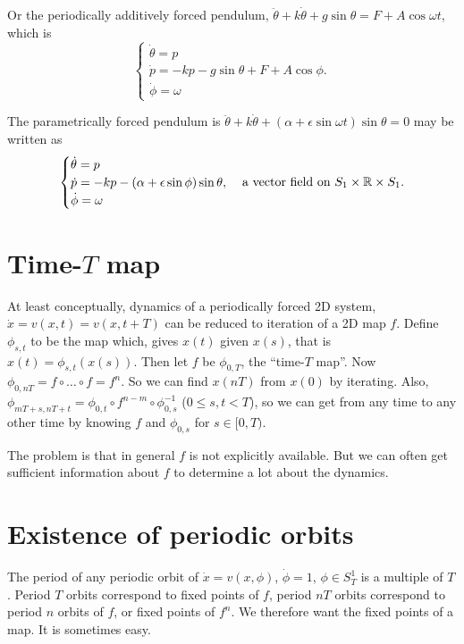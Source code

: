 \documentclass{notes}
\theoremstyle{plain}
\begin{document}
Or the periodically additively forced pendulum, $\ddot{\theta}
+ k \dot{\theta} + g \sin \theta = F + A \cos \omega t$, which is
\[
\begin{cases}
\dot{\theta} = p \\
\dot{p} = -k p - g \sin \theta + F + A \cos \phi. \\
\dot{\phi} = \omega
\end{cases}
\]

The parametrically forced pendulum is $\ddot{\theta} + k \dot{\theta}
+ (\alpha + \epsilon \sin \omega t) \sin \theta = 0$ may be written as
\[
\begin{cases}
\dot{\theta} = p \\
\dot{p} = -k p - (\alpha + \epsilon \sin \phi) \sin \theta, \\
\dot{\phi} = \omega
\end{cases}\text{a vector field on } S_1 \times \mathbb{R} \times S_1.
\]

\section{Time-$T$ map}

At least conceptually, dynamics of a periodically forced 2D system,
$\dot{x} = v(x,t) = v(x,t+T)$ can be reduced to iteration of a 2D map
$f$.  Define $\phi_{s,t}$ to be the map which, gives $x(t)$ given $x(s)$,
that is $x(t) = \phi_{s,t}(x(s))$.  Then let $f$ be $\phi_{0,T}$, the
``time-$T$ map''.  Now $\phi_{0,nT} = f \circ \dots \circ f = f^n$.
So we can find $x(nT)$ from $x(0)$ by iterating.  Also,
$\phi_{m T + s,n T + t} = \phi_{0,t} \circ f^{n-m} \circ \phi_{0,s}^{-1}$
($0 \le s,t < T$), so we can get from any time to any other time
by knowing $f$ and $\phi_{0,s}$ for $s \in [0,T)$.

The problem is that in general $f$ is not explicitly available.  But we can
often get sufficient information about $f$ to determine a lot about the
dynamics.

\section{Existence of periodic orbits}

The period of any periodic orbit of $\dot{x} = v(x,\phi)$, $\dot{\phi} = 1$,
$\phi \in S_T^1$ is a multiple of $T$.  Period $T$ orbits correspond to
fixed points of $f$, period $n T$ orbits correspond to period $n$ orbits
of $f$, or fixed points of $f^n$.  We therefore want the fixed points of
a map.  It is sometimes easy.
\end{document}
